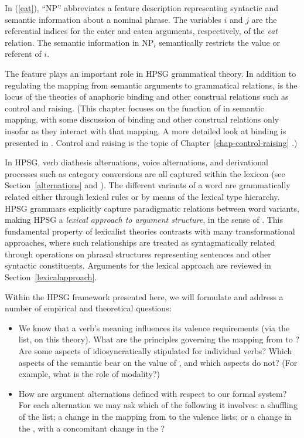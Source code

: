\documentclass[output=paper
 	        ,biblatex
                ,babelshorthands
                ,newtxmath
                ,draftmode
                ,colorlinks, citecolor=brown
]{langscibook}
\begin{document}
	
\noindent
In (\ref{eat}), ``NP'' abbreviates a feature description representing syntactic and semantic information about a nominal phrase.  The variables $i$ and 
$j$ are the referential indices for the eater and eaten arguments, respectively, of the \textit{eat} relation.  The semantic information in 
NP$_i$ semantically restricts the value or referent of $i$. 

The \argst feature plays an important  
role in HPSG grammatical theory.  In addition to regulating the mapping from semantic arguments to
grammatical relations, \argst is the locus of the theories of anaphoric binding and other construal
relations such as control and raising.  (This chapter focuses on the function of \argst  in semantic
mapping, with some discussion of binding and other construal relations only insofar as they interact
with that mapping.  A more detailed look at binding is presented in
. Control and raising is the topic of Chapter~\ref{chap-control-raising} \citep{chapters/control-raising}.)   

In HPSG, verb diathesis alternations, voice alternations, and derivational processes such as category conversions are all captured within the lexicon (see Section~\ref{alternations} and ).  The different variants of a word are grammatically related either through lexical rules or by means of the lexical type hierarchy.  HPSG grammars explicitly capture paradigmatic relations between word variants, making HPSG a \textit{lexical approach to argument structure}, in the sense of \citet{MWArgSt}.
This fundamental property of lexicalist theories contrasts with many transformational approaches, where such relationships are treated as syntagmatically related through operations on phrasal structures representing sentences and other syntactic constituents.  Arguments for the lexical approach are reviewed in Section~\ref{lexicalapproach}.  

Within the HPSG framework presented here, we will formulate and address a number of empirical and theoretical questions: 

\begin{itemize}
\item We know that a verb's meaning influences its valence requirements (via the \argst list, on this theory). 
 What are the principles governing the mapping from \content to \argst?  Are some aspects of \argst idiosyncratically stipulated for individual verbs?  Which aspects of the semantic \content  bear on the value of \argst, and which aspects do not?  (For example, what is the role of modality?)  
\item How are argument alternations defined with respect to our formal system?  For each alternation
  we may ask which of the following it involves: a shuffling of the \argst list;  a change in the
  mapping from \argst to the valence lists; or  a change in the \content, with a concomitant change in the \argst?  
\end{itemize}
\end{document}
